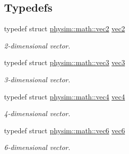 \subsection*{Typedefs}
\begin{DoxyCompactItemize}
\item 
typedef struct \hyperlink{structphysim_1_1math_1_1vec2}{physim\+::math\+::vec2} \hyperlink{namespacephysim_1_1math_afe00b7e2c64c6f8b46f5d9be3f516acf}{vec2}
\begin{DoxyCompactList}\small\item\em 2-\/dimensional vector. \end{DoxyCompactList}\item 
typedef struct \hyperlink{structphysim_1_1math_1_1vec3}{physim\+::math\+::vec3} \hyperlink{namespacephysim_1_1math_a4641a15d91e1eed417901040c33d3c72}{vec3}
\begin{DoxyCompactList}\small\item\em 3-\/dimensional vector. \end{DoxyCompactList}\item 
typedef struct \hyperlink{structphysim_1_1math_1_1vec4}{physim\+::math\+::vec4} \hyperlink{namespacephysim_1_1math_a325cbe58f444c9ff84ca5831849f35ca}{vec4}
\begin{DoxyCompactList}\small\item\em 4-\/dimensional vector. \end{DoxyCompactList}\item 
typedef struct \hyperlink{structphysim_1_1math_1_1vec6}{physim\+::math\+::vec6} \hyperlink{namespacephysim_1_1math_a4927e09ba2ee25602c7ca62839a24d53}{vec6}
\begin{DoxyCompactList}\small\item\em 6-\/dimensional vector. \end{DoxyCompactList}\end{DoxyCompactItemize}
